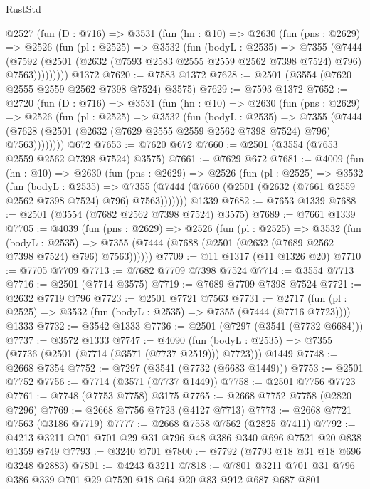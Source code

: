 \begin{lexlean}{RustStd}
\begin{coremodule}
    @2527
      (fun (D : @716) =>
      @3531
        (fun (hn : @10) =>
        @2630
          (fun (pns : @2629) =>
          @2526
            (fun (pl : @2525) =>
            @3532
              (fun (bodyL : @2535) =>
              @7355
                (@7444
                  (@7592
                    (@2501 (@2632 (@7593 @2583 @2555 @2559 @2562 @7398 @7524) @796) @7563)))))))))
    @1372
@7620 := @7583 @1372
@7628 := @2501 (@3554 (@7620 @2555 @2559 @2562 @7398 @7524) @3575)
@7629 := @7593 @1372
@7652 := @2720
    (fun (D : @716) =>
    @3531
      (fun (hn : @10) =>
      @2630
        (fun (pns : @2629) =>
        @2526
          (fun (pl : @2525) =>
          @3532
            (fun (bodyL : @2535) =>
            @7355
              (@7444 (@7628 (@2501 (@2632 (@7629 @2555 @2559 @2562 @7398 @7524) @796) @7563))))))))
    @672
@7653 := @7620 @672
@7660 := @2501 (@3554 (@7653 @2559 @2562 @7398 @7524) @3575)
@7661 := @7629 @672
@7681 := @4009
    (fun (hn : @10) =>
    @2630
      (fun (pns : @2629) =>
      @2526
        (fun (pl : @2525) =>
        @3532
          (fun (bodyL : @2535) =>
          @7355 (@7444 (@7660 (@2501 (@2632 (@7661 @2559 @2562 @7398 @7524) @796) @7563)))))))
    @1339
@7682 := @7653 @1339
@7688 := @2501 (@3554 (@7682 @2562 @7398 @7524) @3575)
@7689 := @7661 @1339
@7705 := @4039
    (fun (pns : @2629) =>
    @2526
      (fun (pl : @2525) =>
      @3532
        (fun (bodyL : @2535) =>
        @7355 (@7444 (@7688 (@2501 (@2632 (@7689 @2562 @7398 @7524) @796) @7563))))))
@7709 := @11 @1317 (@11 @1326 @20)
@7710 := @7705 @7709
@7713 := @7682 @7709 @7398 @7524
@7714 := @3554 @7713
@7716 := @2501 (@7714 @3575)
@7719 := @7689 @7709 @7398 @7524
@7721 := @2632 @7719 @796
@7723 := @2501 @7721 @7563
@7731 := @2717
    (fun (pl : @2525) => @3532 (fun (bodyL : @2535) => @7355 (@7444 (@7716 @7723))))
    @1333
@7732 := @3542 @1333
@7736 := @2501 (@7297 (@3541 (@7732 @6684)))
@7737 := @3572 @1333
@7747 := @4090
    (fun (bodyL : @2535) => @7355 (@7736 (@2501 (@7714 (@3571 (@7737 @2519))) @7723)))
    @1449
@7748 := @2668 @7354
@7752 := @7297 (@3541 (@7732 (@6683 @1449)))
@7753 := @2501 @7752
@7756 := @7714 (@3571 (@7737 @1449))
@7758 := @2501 @7756 @7723
@7761 := @7748 (@7753 @7758) @3175
@7765 := @2668 @7752 @7758 (@2820 @7296)
@7769 := @2668 @7756 @7723 (@4127 @7713)
@7773 := @2668 @7721 @7563 (@3186 @7719)
@7777 := @2668 @7558 @7562 (@2825 @7411)
@7792 := @4213 @3211 @701 @701 @29 @31 @796 @48 @386 @340 @696 @7521 @20 @838 @1359 @749
@7793 := @3240 @701
@7800 := @7792 (@7793 @18 @31 @18 @696 @3248 @2883)
@7801 := @4243 @3211
@7818 := @7801 @3211 @701 @31 @796 @386 @339 @701 @29 @7520 @18 @64 @20 @83 @912 @687 @687 @801

\end{coremodule}
\end{lexlean}
